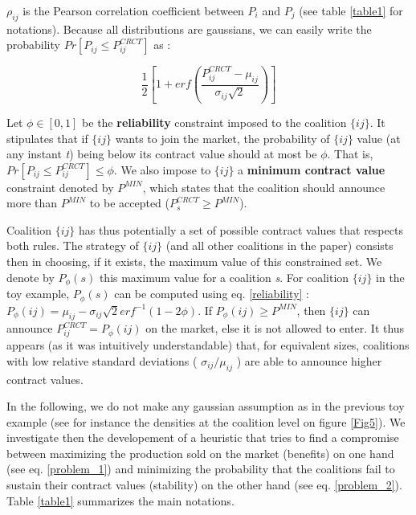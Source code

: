 \documentclass[conference]{IEEEtran}
\begin{document}
$ \rho_{ij} $ is the Pearson correlation coefficient between $ P_{i} $ and $ P_{j} $ (see table \ref{table1} for notations). Because all distributions are gaussians, we can easily write the probability $ Pr[P_{ij} \leq P_{ij}^{CRCT} ] $ as :

\begin{equation}
\dfrac{1}{2} \left[ 1+ erf \left( \dfrac{P_{ij}^{CRCT} - \mu_{ij}}{\sigma_{ij}\sqrt{2}} \right) \right]
\label{reliability}
\end{equation}

Let $ \phi \in [0,1] $ be the \textbf{reliability} constraint imposed to the coalition $\{ij\} $. It stipulates that if $\{ij\} $ wants to join the market, the probability of $\{ij\} $ value (at any instant \textit{t}) being below its contract value should at most be $ \phi $. That is, $ Pr[P_{ij} \leq P_{ij}^{CRCT} ] \leq \phi $. We also impose to $ \{ij\} $ a \textbf{minimum contract value} constraint denoted by $ P^{MIN} $, which states that the coalition should announce more than $ P^{MIN} $ to be accepted ($ P_{s}^{CRCT} \geq P^{MIN} $).

Coalition $ \{ij\} $ has thus potentially a set of possible contract values that respects both rules. The strategy of $ \{ij\} $ (and all other coalitions in the paper) consists then in choosing, if it exists, the maximum value of this constrained set. We denote by $ P_{\phi}(s) $ this maximum value for a coalition \textit{s}. For coalition $ \{ij\} $ in the toy example, $ P_{\phi}(s) $ can be computed using eq. \ref{reliability} : $ P_{\phi}(ij) = \mu_{ij} - \sigma_{ij}\sqrt{2}erf^{-1}(1-2 \phi ) $. If  $ P_{\phi}(ij) \geq P^{MIN} $, then $ \{ij\} $ can announce $ P_{ij}^{CRCT} = P_{\phi}(ij)$ on the market, else it is not allowed to enter. It thus appears (as it was intuitively understandable) that, for equivalent sizes, coalitions with low relative standard deviations ( $ \sigma_{ij} / \mu_{ij} $ ) are able to announce higher contract values. 


In the following, we do not make any gaussian assumption as in the previous toy example (see for instance the densities at the coalition level on figure \ref{Fig5}). We investigate then the developement of a heuristic that tries to find a compromise between maximizing the production sold on the market (benefits) on one hand (see eq. \ref{problem_1}) and minimizing the probability that the coalitions fail to sustain their contract values (stability) on the other hand (see eq. \ref{problem_2}). Table \ref{table1} summarizes the main notations.
\end{document}
